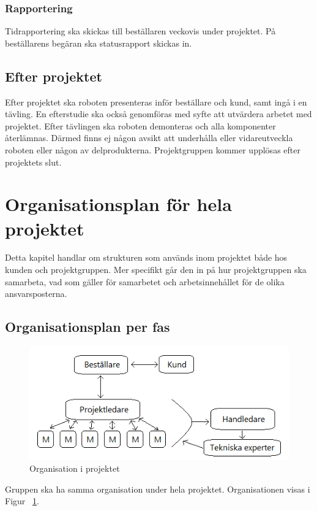 \documentclass{article}
\begin{document}
\subsubsection{Rapportering}
Tidrapportering ska skickas till beställaren veckovis under projektet. På beställarens begäran ska statusrapport skickas in.

\subsection{Efter projektet}
Efter projektet ska roboten presenteras inför beställare och kund, samt ingå i en tävling. En efterstudie ska också genomföras med syfte att utvärdera arbetet med projektet. Efter tävlingen ska roboten demonteras och alla komponenter återlämnas. Därmed finns ej någon avsikt att underhålla eller vidareutveckla roboten eller någon av delprodukterna. Projektgruppen kommer upplösas efter projektets slut.

\section{Organisationsplan för hela projektet}
Detta kapitel handlar om strukturen som används inom projektet både hos kunden och projektgruppen. Mer specifikt går den in på hur projektgruppen ska samarbeta, vad som gäller för samarbetet och arbetsinnehållet för de olika ansvarsposterna.

\subsection{Organisationsplan per fas}
\begin{figure}[H]
\centering
\includegraphics{Organisationsplan}
\caption{Organisation i projektet}
\label{fig:organisationsplan}
\end{figure}
Gruppen ska ha samma organisation under hela projektet. Organisationen visas i Figur ~\ref{fig:organisationsplan}.
\end{document}
